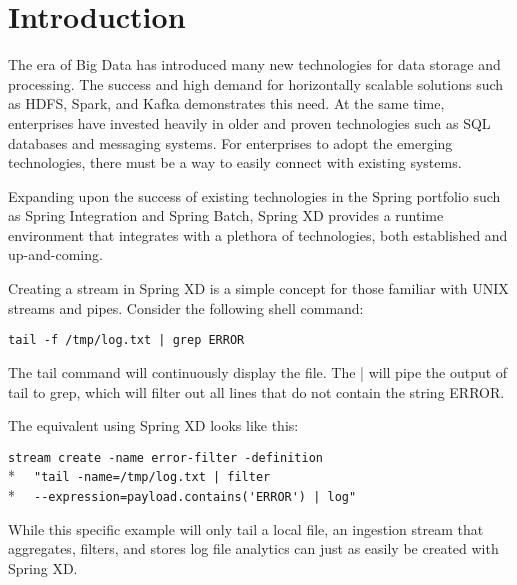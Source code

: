 \section{Introduction}

The era of Big Data has introduced many new technologies for data storage
and processing. The success and high demand for horizontally scalable
solutions such as HDFS, Spark, and Kafka demonstrates this need. At the
same time, enterprises have invested heavily in older and proven
technologies such as SQL databases and messaging systems. For enterprises
to adopt the emerging technologies, there must be a way to easily
connect with existing systems.

Expanding upon the success of existing technologies in the Spring portfolio
such as Spring Integration and Spring Batch, Spring XD provides a runtime
environment that integrates with a plethora of technologies, both established
and up-and-coming.

Creating a stream in Spring XD is a simple concept for those familiar with
UNIX streams and pipes. Consider the following shell command:

\verb;tail -f /tmp/log.txt | grep ERROR;

The tail command will continuously display the file. The |
will pipe the output of tail to grep, which will filter out all
lines that do not contain the string ERROR.

The equivalent using Spring XD looks like this:

\verb;stream create -name error-filter -definition;\\*
\verb;  "tail -name=/tmp/log.txt | filter;\\*
\verb;  --expression=payload.contains('ERROR') | log";

While this specific example will only tail a local file, an ingestion stream
that aggregates, filters, and stores log file analytics can just as easily
be created with Spring XD.
